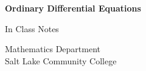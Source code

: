 \begin{titlepage}
  \begin{center}
    \vspace*{1cm}

    \textbf{Ordinary Differential Equations}

    \vspace{0.5cm}
    In Class Notes

    \vspace{1.5cm}

    
    \vfill


    \vspace{0.8cm}


    Mathematics Department \\
    Salt Lake Community College\\

  \end{center}
\end{titlepage}
